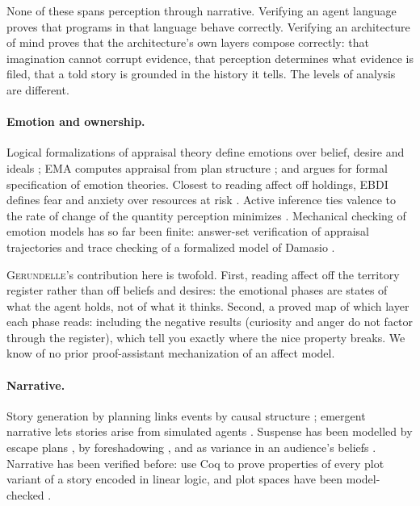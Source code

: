 \documentclass[11pt]{article}
\newcommand{\gerundelle}{\textsc{Gerundelle}}
\theoremstyle{remark}
\begin{document}
None of these spans perception through narrative. Verifying an agent language proves that
programs in that language behave correctly. Verifying an architecture of mind proves that
the architecture's own layers compose correctly: that imagination cannot corrupt evidence,
that perception determines what evidence is filed, that a told story is grounded in the
history it tells. The levels of analysis are different.

\paragraph{Emotion and ownership.}

Logical formalizations of appraisal theory define emotions over belief, desire and ideals
\citep{AdamHerzigLongin2009,SteunebrinkDastaniMeyer2012}; EMA computes appraisal from
plan structure \citep{GratchMarsella2004}; and \citet{Reisenzein2013} argues for formal
specification of emotion theories. Closest to reading affect off holdings, EBDI defines
fear and anxiety over resources at risk \citep{PereiraOliveiraMoreira2008}. Active
inference ties valence to the rate of change of the quantity perception minimizes
\citep{JoffilyCoricelli2013}. Mechanical checking of emotion models has so far been
finite: answer-set verification of appraisal trajectories \citep{BrannstromNieves2025} and
trace checking of a formalized model of Damasio \citep{BosseJonkerTreur2008}.

\gerundelle{}'s contribution here is twofold. First, reading affect off the territory
register rather than off beliefs and desires: the emotional phases are states of what the
agent holds, not of what it thinks. Second, a proved map of which layer each phase reads:
including the negative results (curiosity and anger do not factor through the register),
which tell you exactly where the nice property breaks. We know of no prior
proof-assistant mechanization of an affect model.

\paragraph{Narrative.}

Story generation by planning links events by causal structure
\citep{RiedlYoung2010,WareYoung2014}; emergent narrative lets stories arise from
simulated agents \citep{EvansShort2014}. Suspense has been modelled by escape plans
\citep{ONeillRiedl2014}, by foreshadowing \citep{BaeYoung2008}, and as variance in an
audience's beliefs \citep{ElyFrankelKamenica2015}. Narrative has been verified before:
\citet{Bosser2011} use Coq to prove properties of every plot variant of a story encoded
in linear logic, and plot spaces have been model-checked
\citep{ThompsonBattlePadget2015}.
\end{document}
